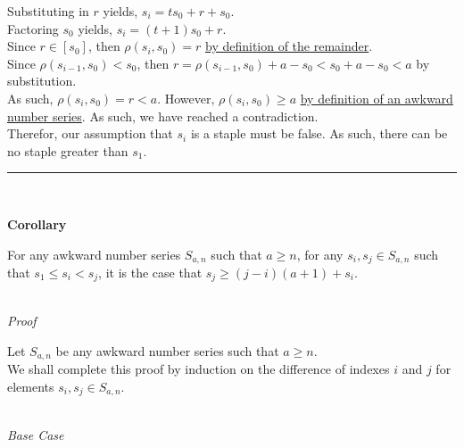 \documentclass[a4paper,12pt]{article}
\begin{document}
\noindent Substituting in $r$ yields, $s_i = ts_0 + r + s_0$.\\

\noindent Factoring $s_0$ yields, $s_i = (t + 1)s_0 + r$.\\

\noindent Since $r \in [s_0]$, then $\rho(s_i, s_0) = r$ \hyperlink{theorem:remainder_theorem}{by definition of the remainder}.\\

\noindent Since $\rho(s_{i - 1}, s_0) < s_0$, then $r = \rho(s_{i - 1}, s_0) + a - s_0 < s_0 + a - s_0 < a$ by substitution.\\

\noindent As such, $\rho(s_i, s_0) = r < a$. However, $\rho(s_i, s_0) \geq a$ \hyperlink{definition:awkward_number_series}{by definition of an awkward number series}. As such, we have reached a contradiction.\\

\noindent Therefor, our assumption that $s_i$ is a staple must be false. As such, there can be no staple greater than $s_1$.


\begin{center}
\noindent\rule{8cm}{0.4pt}
\end{center}
\noindent \\







\label{corollary:min_length_one_staple}
\hypertarget{corollary:min_length_one_staple}{}
\begin{tcolorbox}
\textbf{Corollary}

\noindent For any awkward number series $S_{a,n}$ such that $a \geq n$, for any $s_i, s_j \in S_{a, n}$ such that $s_1 \leq s_i < s_j$, it is the case that $s_j \geq (j - i)(a + 1) + s_i$.

\end{tcolorbox}

\noindent \\
\textit{Proof}

\noindent Let $S_{a, n}$ be any awkward number series such that $a \geq n$.\\

\noindent We shall complete this proof by induction on the difference of indexes $i$ and $j$ for elements $s_i, s_j \in S_{a, n}$.

\noindent \\
\textit{Base Case}
\end{document}
